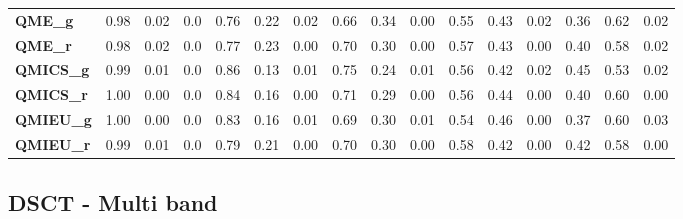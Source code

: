\begin{anexo}
\begin{table}
{\begin{tabular}{lrrrrrrrrrrrrrrr}
\textbf{QME\_g  } &        0.98 &  0.02 &      0.0 &        0.76 &  0.22 &     0.02 &        0.66 &  0.34 &     0.00 &        0.55 &  0.43 &     0.02 &        0.36 &  0.62 &     0.02 \\
\textbf{QME\_r  } &        0.98 &  0.02 &      0.0 &        0.77 &  0.23 &     0.00 &        0.70 &  0.30 &     0.00 &        0.57 &  0.43 &     0.00 &        0.40 &  0.58 &     0.02 \\
\textbf{QMICS\_g} &        0.99 &  0.01 &      0.0 &        0.86 &  0.13 &     0.01 &        0.75 &  0.24 &     0.01 &        0.56 &  0.42 &     0.02 &        0.45 &  0.53 &     0.02 \\
\textbf{QMICS\_r} &        1.00 &  0.00 &      0.0 &        0.84 &  0.16 &     0.00 &        0.71 &  0.29 &     0.00 &        0.56 &  0.44 &     0.00 &        0.40 &  0.60 &     0.00 \\
\textbf{QMIEU\_g} &        1.00 &  0.00 &      0.0 &        0.83 &  0.16 &     0.01 &        0.69 &  0.30 &     0.01 &        0.54 &  0.46 &     0.00 &        0.37 &  0.60 &     0.03 \\
\textbf{QMIEU\_r} &        0.99 &  0.01 &      0.0 &        0.79 &  0.21 &     0.00 &        0.70 &  0.30 &     0.00 &        0.58 &  0.42 &     0.00 &        0.42 &  0.58 &     0.00 \\
\bottomrule
\end{tabular}}
\end{table}    
    
    
    \subsection{DSCT - Multi band}
    
\begin{table}
\centering
\caption{Resumen de resultados DSCT multi band.}
\label{anexo:DSCTmb}
\end{table}    
    

\end{anexo}
